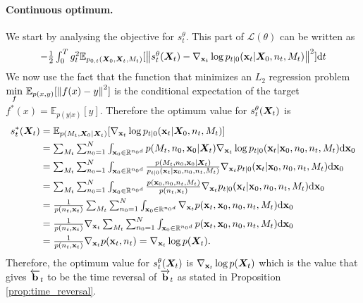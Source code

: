 \paragraph{Continuous optimum.} We start by analysing the objective for
$s_t^\theta$. This part of $\mathcal{L}(\theta)$ can be written as
\begin{equation}
  \textstyle 
    -\frac{1}{2} \int_{0}^T g_t^2 \mathbb{E}_{p_{0,t}({\bm{X}}_0, {\bm{X}}_t, M_t)} [ \left\lVert s_t^\theta({\bm{X}}_t) - \nabla_{{\mathbf{x}}_t} \log p_{t|0}({\mathbf{x}}_t | {\bm{X}}_0, n_t, M_t) \right\rVert^2 ] \mathrm{d} t
\end{equation}
We now use the fact that the function that minimizes an $L_2$ regression problem $\underset{f}{\text{min}} \,\, \mathbb{E}_{p(x, y)} [ \left\lVert f(x) - y\right\rVert^2 ]$ is the conditional expectation of the target $f^*(x) = \mathbb{E}_{p(y|x)} [ y]$. Therefore the optimum value for $s_t^\theta({\bm{X}}_t)$ is
\begin{align}
    s_t^*({\bm{X}}_t) &\textstyle = \mathbb{E}_{p(M_t, {\bm{X}}_0 | {\bm{X}}_t)} [ \nabla_{{\mathbf{x}}_t} \log p_{t|0}({\mathbf{x}}_t | {\bm{X}}_0, n_t, M_t) ]\\
    &\textstyle = \sum_{M_t} \sum_{n_0=1}^N \int_{{\mathbf{x}}_0 \in \mathbb{R}^{n_0 d}} p(M_t, n_0, {\mathbf{x}}_0 | {\bm{X}}_t) \nabla_{{\mathbf{x}}_t} \log p_{t|0}({\mathbf{x}}_t | {\mathbf{x}}_0, n_0, n_t, M_t) \mathrm{d} {\mathbf{x}}_0\\
    &\textstyle = \sum_{M_t} \sum_{n_0=1}^N \int_{{\mathbf{x}}_0 \in \mathbb{R}^{n_0 d}} \frac{p(M_t, n_0, {\mathbf{x}}_0 | {\bm{X}}_t)}{p_{t|0}({\mathbf{x}}_t | {\mathbf{x}}_0, n_0, n_t, M_t)} \nabla_{{\mathbf{x}}_t} p_{t|0}({\mathbf{x}}_t | {\mathbf{x}}_0, n_0, n_t, M_t) \mathrm{d} {\mathbf{x}}_0\\
    &\textstyle = \sum_{M_t} \sum_{n_0=1}^N \int_{{\mathbf{x}}_0 \in \mathbb{R}^{n_0 d}} \frac{p({\mathbf{x}}_0, n_0, n_t, M_t)}{p(n_t, {\mathbf{x}}_t)} \nabla_{{\mathbf{x}}_t} p_{t|0}({\mathbf{x}}_t | {\mathbf{x}}_0, n_0, n_t, M_t) \mathrm{d} {\mathbf{x}}_0\\
    &\textstyle = \frac{1}{p(n_t, {\mathbf{x}}_t)} \sum_{M_t} \sum_{n_0=1}^N \int_{{\mathbf{x}}_0 \in \mathbb{R}^{n_0 d}}  \nabla_{{\mathbf{x}}_t} p({\mathbf{x}}_t, {\mathbf{x}}_0, n_0, n_t, M_t) \mathrm{d} {\mathbf{x}}_0\\
    &\textstyle = \frac{1}{p(n_t, {\mathbf{x}}_t)} \nabla_{{\mathbf{x}}_t} \sum_{M_t} \sum_{n_0=1}^N \int_{{\mathbf{x}}_0 \in \mathbb{R}^{n_0 d}}  p({\mathbf{x}}_t, {\mathbf{x}}_0, n_0, n_t, M_t) \mathrm{d} {\mathbf{x}}_0\\
    &\textstyle = \frac{1}{p(n_t, {\mathbf{x}}_t)} \nabla_{{\mathbf{x}}_t} p({\mathbf{x}}_t, n_t) \textstyle = \nabla_{{\mathbf{x}}_t}\log p({\bm{X}}_t) . 
\end{align}
Therefore, the optimum value for $s_t^\theta({\bm{X}}_t)$ is $\nabla_{{\mathbf{x}}_t} \log p({\bm{X}}_t)$ which is the value that gives $\overleftarrow{\mathbf{b}}_t$ to be the time reversal of $\overrightarrow{\mathbf{b}}_t$ as stated in Proposition \ref{prop:time_reversal}.\\

